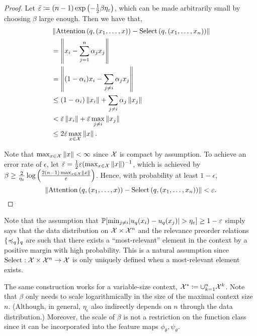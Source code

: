 \begin{proof}
    Let $\bar{\varepsilon} \coloneq (n-1) \exp\left(- \frac{1}{2} \beta \eta_{\varepsilon}\right)$, which can be made arbitrarily small by choosing $\beta$ large enough. Then we have that,
    \begin{align*}
        &\norm{\mathrm{Attention}\paren{q, (x_1, \ldots, x)} - \mathrm{Select}\paren{q, (x_1, \ldots, x_n)}} \\
        &= \norm{x_i - \sum_{j=1}^n{\alpha_j} x_j} \\
        &= \norm{(1 - \alpha_i) x_i - \sum_{j\neq i} {\alpha_j} x_j} \\
        &\leq (1 - \alpha_i)  \norm{x_i} + \sum_{j \neq i} \alpha_j \norm{x_j}\\
        &< \bar{\epsilon} \norm{x_i} + \bar{\epsilon}     \max_{j \neq i}\norm{x_j} \\
        &\leq 2 \bar{\epsilon} \max_{x \in \calX} \norm{x}.
    \end{align*}

    Note that $\max_{x \in {\mathcal{X}}} \left\lVert x\right\rVert < \infty$ since ${\mathcal{X}}$ is compact by assumption. To achieve an error rate of $\epsilon$, let $\bar{\varepsilon} = \frac{1}{2} \varepsilon (\max_{x \in {\mathcal{X}}} \left\lVert x\right\rVert)^{-1}$, which is achieved by $\beta \geq \frac{2}{\eta_\varepsilon} \log\left(\frac{2 (n-1) \max_{x \in {\mathcal{X}}} \left\lVert x\right\rVert}{\varepsilon}\right)$. Hence, with probability at least $1 - \epsilon$,
    \begin{equation*}
        \norm{\mathrm{Attention}\paren{q, (x_1, \ldots, x)} - \mathrm{Select}\paren{q, (x_1, \ldots, x_n)}} < \epsilon.
    \end{equation*}
\end{proof}

\begin{remark}
    Note that the assumption that $\mathbb{P}[\min_{j \neq i} \lvert u_q(x_i) - u_q(x_j)\rvert > \eta_\varepsilon] \geq 1 - \varepsilon$ simply says that the data distribution on ${\mathcal{X}} \times {\mathcal{X}}^n$ and the relevance preorder relations $\{\preccurlyeq_q\}_q$ are such that there exists a ``most-relevant'' element in the context by a positive margin with high probability. This is a natural assumption since $\mathrm{Select}: {\mathcal{X}} \times {\mathcal{X}}^n \to {\mathcal{X}}$ is only uniquely defined when a most-relevant element exists.
\end{remark}

\begin{remark}
    The same construction works for a variable-size context, ${\mathcal{X}}^* \coloneq \cup_{k=1}^n {\mathcal{X}}^k$. Note that $\beta$ only needs to scale logarithmically in the size of the maximal context size $n$. (Although, in general, $\eta_\epsilon$ also indirectly depends on $n$ through the data distribution.) Moreover, the scale of $\beta$ is not a restriction on the function class since it can be incorporated into the feature maps $\phi_\theta, \psi_\theta$.
\end{remark}
